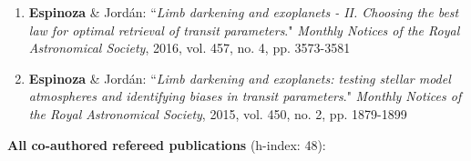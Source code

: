 \documentclass[12pt, a4paper]{article} %
\begin{document}
\begin{flushleft}
\begin{enumerate}
\item \textbf{Espinoza} \& Jordán: ``\textit{Limb darkening and exoplanets - II. Choosing the best law for optimal retrieval of transit parameters}." \textit{Monthly Notices of the Royal Astronomical Society}, 2016, vol. 457, no. 4, pp. 3573-3581

\item \textbf{Espinoza} \& Jordán: ``\textit{Limb darkening and exoplanets: testing stellar model atmospheres and identifying biases in transit parameters}." \textit{Monthly Notices of the Royal Astronomical Society}, 2015, vol. 450, no. 2, pp. 1879-1899

\end{enumerate}

\pagebreak

\textbf{All co-authored refereed publications} (h-index: 48):
\begin{enumerate}
\setlength\itemsep{0.05cm}

\setcounter{enumi}{27}


\end{enumerate}
\end{flushleft}
\end{document}
